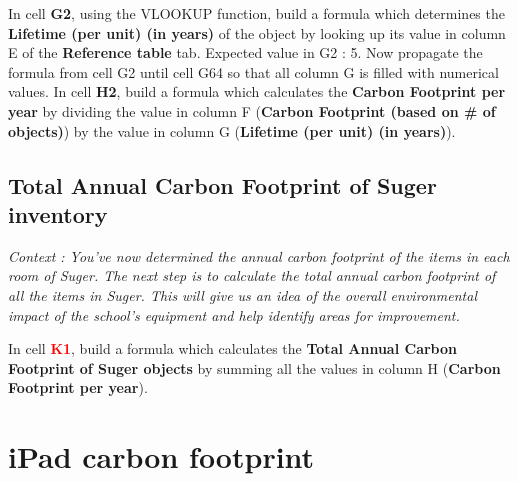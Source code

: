 \documentclass{exam}
\begin{document}
\begin{questions}
  \question In cell \textbf{G2}, using the VLOOKUP function, build a formula which determines the \textbf{Lifetime (per unit) (in years)} of the object by looking up its value in column E of the \textbf{Reference table} tab. Expected value in G2 : 5.
  \question Now propagate the formula from cell G2 until cell G64 so that all column G is filled with numerical values.
  \question In cell \textbf{H2}, build a formula which calculates the \textbf{Carbon Footprint per year} by dividing the value in column F (\textbf{Carbon Footprint (based on \# of objects)}) by the value in column G (\textbf{Lifetime (per unit) (in years)}).
\end{questions}

\subsection*{Total Annual Carbon Footprint of Suger inventory}

\textit{Context : You've now determined the annual carbon footprint of the items in each room of Suger. The next step is to calculate the total annual carbon footprint of all the items in Suger. This will give us an idea of the overall environmental impact of the school's equipment and help identify areas for improvement.}

\begin{questions}
  \question In cell \textbf{\textcolor{red}{K1}}, build a formula which calculates the \textbf{Total Annual Carbon Footprint of Suger objects} by summing all the values in column H (\textbf{Carbon Footprint per year}).
\end{questions}

\section{iPad carbon footprint}
\end{document}
